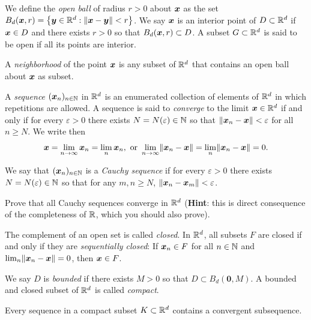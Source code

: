 We define the \emph{open ball} of radius $r>0$ about $\boldsymbol{x}$ as the set $B_d(\boldsymbol{x},r) = \big\{ \boldsymbol{y} \in \mathbb{R}^d : \lVert \boldsymbol{x}- \boldsymbol{y} \rVert < r \big\}$.  We say $\boldsymbol{x}$ is an interior point of $D \subset \mathbb{R}^d$ if $\boldsymbol{x} \in D$ and there exists $r>0$ so that $B_d(\boldsymbol{x}, r) \subset D$.  A subset $G \subset \mathbb{R}^d$ is said to be open if all its points are interior.

A \emph{neighborhood} of the point $\boldsymbol{x}$ is any subset of $\mathbb{R}^d$ that contains an open ball about $\boldsymbol{x}$ as subset. 

A \emph{sequence} $({\boldsymbol{x}}_{n})_{{n}\in\mathbb{N}}$ in $\mathbb{R}^d$ is an enumerated collection of elements of $\mathbb{R}^d$ in which repetitions are allowed.  A sequence is said to \emph{converge} to the limit $\boldsymbol{x} \in \mathbb{R}^d$ if and only if for every $\varepsilon>0$ there exists $N=N(\varepsilon) \in \mathbb{N}$ so that $\lVert \boldsymbol{x}_n - \boldsymbol{x} \rVert < \varepsilon$ for all $n \geq N$.  We write then 
\begin{equation*}
\boldsymbol{x} = \lim_{n\to\infty} \boldsymbol{x}_n = \lim_n \boldsymbol{x}_n, \text{ or } \lim_{n\to\infty} \lVert \boldsymbol{x}_n - \boldsymbol{x} \rVert = \lim_n \lVert \boldsymbol{x}_n - \boldsymbol{x} \rVert = 0.
\end{equation*}

We say that $({\boldsymbol{x}}_{n})_{{n}\in\mathbb{N}}$ is a \emph{Cauchy sequence} if for every $\varepsilon>0$ there exists $N = N(\varepsilon) \in \mathbb{N}$ so that for any $m,n \geq N$, $\lVert \boldsymbol{x}_n - \boldsymbol{x}_m \rVert < \varepsilon$.  

\begin{problem}\label{problem:Rdcomplete}
Prove that all Cauchy sequences converge in $\mathbb{R}^d$ (\textbf{Hint}: this is direct consequence of the completeness of $\mathbb{R}$, which you should also prove).
\end{problem}

The complement of an open set is called \emph{closed}. In $\mathbb{R}^d$, all subsets $F$ are closed if and only if they are \emph{sequentially closed}: If $\boldsymbol{x}_n\in F$ for all $n \in \mathbb{N}$ and $\lim_n \lVert \boldsymbol{x}_n - \boldsymbol{x} \rVert = 0$, then $\boldsymbol{x} \in F$.

We say $D$ is \emph{bounded} if there exists $M>0$ so that $D \subset B_d(\boldsymbol{0}, M)$.  A bounded and closed subset of $\mathbb{R}^d$ is called \emph{compact}.

\begin{theorem}\label{theorem:BolzanoWeierstrass}
Every sequence in a compact subset $K \subset \mathbb{R}^d$ contains a convergent subsequence.
\end{theorem}

